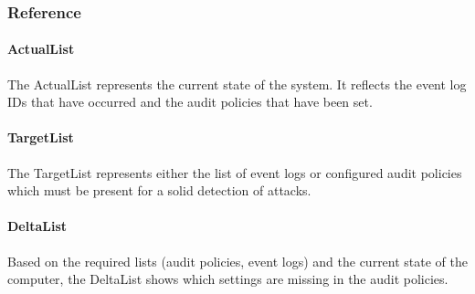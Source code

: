 \subsubsection{Reference}
\paragraph{ActualList}
The ActualList represents the current state of the system. It reflects the event log IDs that have occurred and the audit policies that have been set.

\paragraph{TargetList}
The TargetList represents either the list of event logs or configured audit policies which must be present for a solid detection of attacks.

\paragraph{DeltaList}
Based on the required lists (audit policies, event logs) and the current state of the computer, the DeltaList shows which settings are missing in the audit policies.